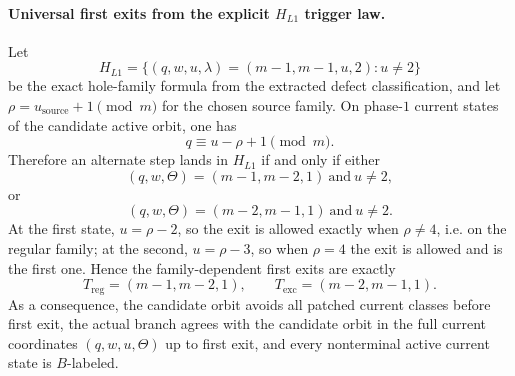 \paragraph{Universal first exits from the explicit \(H_{L1}\) trigger law.}
Let
\[
H_{L1}=\{(q,w,u,\lambda)=(m-1,m-1,u,2):u\neq 2\}
\]
be the exact hole-family formula from the extracted defect classification, and let
\(
\rho=u_{\mathrm{source}}+1 \pmod m
\)
for the chosen source family. On phase-\(1\) current states of the candidate active orbit, one has
\[
q\equiv u-\rho+1 \pmod m.
\]
Therefore an alternate step lands in \(H_{L1}\) if and only if either
\[
(q,w,\Theta)=(m-1,m-2,1)\ \text{and}\ u\neq 2,
\]
or
\[
(q,w,\Theta)=(m-2,m-1,1)\ \text{and}\ u\neq 2.
\]
At the first state,
\(
 u=\rho-2
\), so the exit is allowed exactly when \(\rho\neq 4\), i.e. on the regular family; at the second,
\(
 u=\rho-3
\), so when \(\rho=4\) the exit is allowed and is the first one. Hence the family-dependent first exits are exactly
\[
T_{\mathrm{reg}}=(m-1,m-2,1),
\qquad
T_{\mathrm{exc}}=(m-2,m-1,1).
\]
As a consequence, the candidate orbit avoids all patched current classes before first exit, the actual branch agrees with the candidate orbit in the full current coordinates \((q,w,u,\Theta)\) up to first exit, and every nonterminal active current state is \(B\)-labeled.
